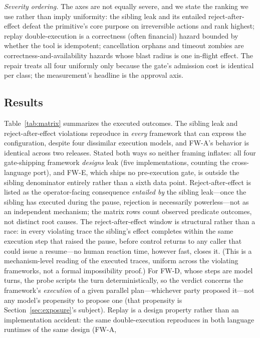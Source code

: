 \documentclass[10pt,journal,compsoc]{IEEEtran}
\begin{document}
\noindent\emph{Severity ordering.} The axes are not equally severe, and we
state the ranking we use rather than imply uniformity: the sibling leak and
its entailed reject-after-effect defeat the primitive's core purpose on
irreversible actions and rank highest; replay double-execution is a
correctness (often financial) hazard bounded by whether the tool is
idempotent; cancellation orphans and timeout zombies are
correctness-and-availability hazards whose blast radius is one in-flight
effect. The repair treats all four uniformly only because the gate's
admission cost is identical per class; the measurement's headline is the
approval axis.

\subsection{Results}
Table~\ref{tab:matrix} summarizes the executed outcomes. The sibling leak and
reject-after-effect violations reproduce in \emph{every} framework that can
express the configuration, despite four dissimilar execution models, and
\textsf{FW-A}'s behavior is identical across two releases. Stated both ways
so neither framing inflates: all four gate-shipping framework \emph{designs}
leak (five implementations, counting the cross-language port), and
\textsf{FW-E}, which ships no pre-execution gate, is outside the sibling
denominator entirely rather than a sixth data point. Reject-after-effect is
listed as the operator-facing consequence \emph{entailed by} the sibling
leak---once the sibling has executed during the pause, rejection is
necessarily powerless---not as an independent mechanism; the matrix rows
count observed predicate outcomes, not distinct root causes. The
reject-after-effect window is structural rather than a race: in every
violating trace the sibling's effect completes within the same execution step
that raised the pause, before control returns to any caller that could issue a
resume---no human reaction time, however fast, closes it. (This is a
mechanism-level reading of the executed traces, uniform across the violating
frameworks, not a formal impossibility proof.) For \textsf{FW-D},
whose steps are model turns, the probe scripts the turn deterministically, so
the verdict concerns the framework's \emph{execution} of a given parallel
plan---whichever party proposed it---not any model's propensity to propose one
(that propensity is Section~\ref{sec:exposure}'s subject). Replay is a design
property rather than an implementation accident: the same double-execution
reproduces in both language runtimes of the same design (\textsf{FW-A},
\end{document}
